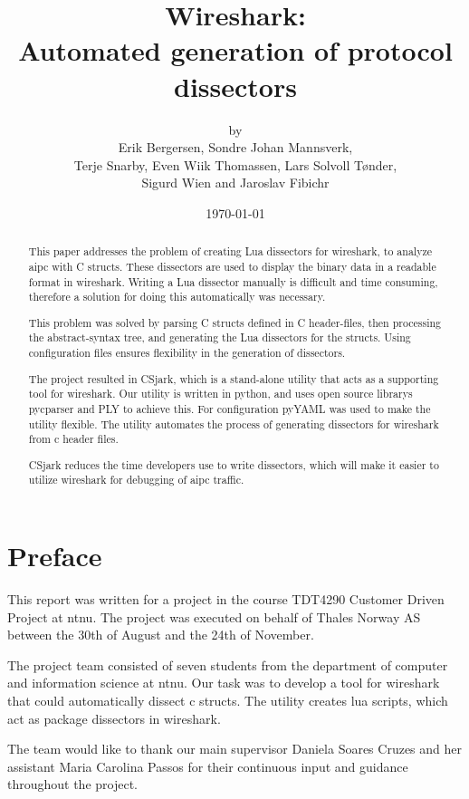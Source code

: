 \documentclass[a4paper, 11pt, notitlepage, twoside, openright]{report}
\title{Wireshark:\\ Automated generation of protocol dissectors}
\author{by\\ Erik Bergersen, Sondre Johan Mannsverk,\\ Terje Snarby,
		Even Wiik Thomassen, Lars Solvoll Tønder,\\ Sigurd Wien
		and Jaroslav Fibichr}
\date{\today}
\begin{document}


\begin{abstract}
This paper addresses the problem of creating Lua dissectors for \Gls{wireshark}, 
to analyze \gls{aipc} with C structs. These dissectors are used to display the 
binary data in a readable format in \Gls{wireshark}. Writing a Lua dissector 
manually is difficult and time consuming, therefore a solution for doing this 
automatically was necessary.  

This problem was solved by parsing C structs defined in C header-files, then 
processing the abstract-syntax tree, and generating the Lua dissectors 
for the structs. Using configuration files ensures flexibility in the generation of 
dissectors.

The project resulted in CSjark, which is a stand-alone \gls{utility} that acts 
as a supporting tool for \Gls{wireshark}. Our \gls{utility} is written in 
\Gls{python}, and uses open source \glspl{library} \gls{pycparser} and 
PLY to achieve this. For configuration pyYAML was used to make the 
utility flexible. The \gls{utility} automates the process of generating 
\glspl{dissector} for \Gls{wireshark} from \Gls{c} \gls{header} files. 

CSjark reduces the time developers use to write dissectors, which 
will make it easier to utilize \Gls{wireshark} for debugging of \gls{aipc}
traffic.
\end{abstract}


\chapter*{Preface}
This report was written for a project in the course TDT4290 Customer Driven
Project at \Gls{ntnu}. The project
was executed on behalf of Thales Norway AS between the 30th of August and the
24th of November.

The project team consisted of seven students from the department of computer
and information science at \Gls{ntnu}. Our task was to develop a tool for \Gls{wireshark}
that could automatically dissect \Gls{c} \glspl{struct}. The \gls{utility} creates \Gls{lua} \glspl{script},
which act as package \glspl{dissector} in \Gls{wireshark}. 

The team would like to thank our main supervisor Daniela Soares Cruzes
and her assistant Maria Carolina Passos for their continuous input and
guidance throughout the project.
\end{document}
